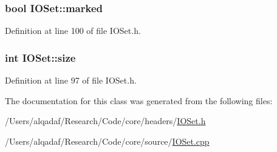 \hypertarget{class_i_o_set_a3fad9f242ab3609cb303f12482fcc772}{
\subsubsection[{marked}]{\setlength{\rightskip}{0pt plus 5cm}bool {\bf IOSet::marked}}}
\label{class_i_o_set_a3fad9f242ab3609cb303f12482fcc772}


Definition at line 100 of file IOSet.h.

\hypertarget{class_i_o_set_ae8acaf98753ad5fc405e7734988e371e}{
\subsubsection[{size}]{\setlength{\rightskip}{0pt plus 5cm}int {\bf IOSet::size}}}
\label{class_i_o_set_ae8acaf98753ad5fc405e7734988e371e}


Definition at line 97 of file IOSet.h.



The documentation for this class was generated from the following files:\begin{DoxyCompactItemize}
\item 
/Users/alqadaf/Research/Code/core/headers/\hyperlink{_i_o_set_8h}{IOSet.h}\item 
/Users/alqadaf/Research/Code/core/source/\hyperlink{_i_o_set_8cpp}{IOSet.cpp}\end{DoxyCompactItemize}
